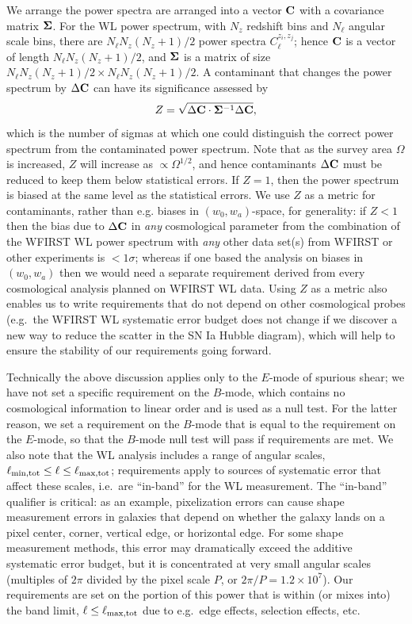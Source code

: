 \documentclass[aps,prd, amsmath,amssymb,superscriptaddress,showkeys,nofootinbib,reprint,preprintnumbers]{revtex4-1}
\begin{document}
\begin{widetext}
We arrange the power spectra are arranged into a vector ${\bf C}$ with
a covariance matrix ${\bf\Sigma}$. For the WL power spectrum, with
$N_z$ redshift bins and $N_\ell$ angular scale bins, there are $N_\ell
N_z(N_z+1)/2$ power spectra $C_\ell^{z_i,z_j}$; hence ${\bf C}$ is a
vector of length $N_\ell N_z(N_z+1)/2$, and ${\bf\Sigma}$ is a matrix
of size $N_\ell N_z(N_z+1)/2 \times N_\ell N_z(N_z+1)/2$. A
contaminant that changes the power spectrum by $\Delta {\bf C}$ can
have its significance assessed by
\begin{equation}
Z = \sqrt{\Delta{\bf C}\cdot{\bf\Sigma}^{-1}\Delta{\bf C}},
\label{eq:alpha}
\end{equation}
which is the number of sigmas at which one could distinguish the
correct power spectrum from the contaminated power spectrum. Note that
as the survey area $\Omega$ is increased, $Z$ will increase as
$\propto\Omega^{1/2}$, and hence contaminants $\Delta{\bf C}$ must be
reduced to keep them below statistical errors. If $Z=1$, then the
power spectrum is biased at the same level as the statistical
errors. We use $Z$ as a metric for contaminants, rather than
e.g. biases in $(w_0,w_a)$-space, for generality: if $Z<1$ then the
bias due to $\Delta{\bf C}$ in {\em any} cosmological parameter from
the combination of the WFIRST WL power spectrum with {\em any} other
data set(s) from WFIRST or other experiments is $<1\sigma$; whereas if
one based the analysis on biases in $(w_0,w_a)$ then we would need a
separate requirement derived from every cosmological analysis planned
on WFIRST WL data. Using $Z$ as a metric also enables us to write
requirements that do not depend on other cosmological probes (e.g.\
the WFIRST WL systematic error budget does not change if we discover a
new way to reduce the scatter in the SN Ia Hubble diagram), which will
help to ensure the stability of our requirements going forward.

Technically the above discussion applies only to the $E$-mode of
spurious shear; we have not set a specific requirement on the
$B$-mode, which contains no cosmological information to linear order
and is used as a null test. For the latter reason, we set a
requirement on the $B$-mode that is equal to the requirement on the
$E$-mode, so that the $B$-mode null test will pass if requirements are
met. We also note that the WL analysis includes a range of angular
scales, $\ell_{\rm min,tot}\le \ell \le \ell_{\rm max,tot}$;
requirements apply to sources of systematic error that affect these
scales, i.e.\ are ``in-band'' for the WL measurement. The ``in-band''
qualifier is critical: as an example, pixelization errors can cause
shape measurement errors in galaxies that depend on whether the galaxy
lands on a pixel center, corner, vertical edge, or horizontal
edge. For some shape measurement methods, this error may dramatically
exceed the additive systematic error budget, but it is concentrated at
very small angular scales (multiples of $2\pi$ divided by the pixel
scale $P$, or $2\pi/P = 1.2\times 10^7$). Our requirements are set on
the portion of this power that is within (or mixes into) the band
limit, $\ell\le\ell_{\rm max,tot}$ due to e.g.\ edge effects,
selection effects, etc.


\end{widetext}
\end{document}
